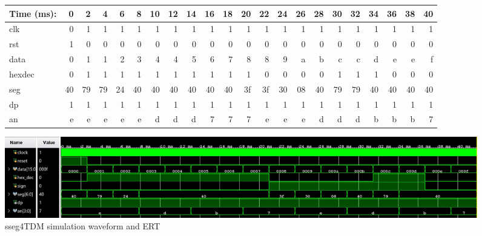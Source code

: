 \documentclass[11pt]{article}
\begin{document}
\begin{figure}[ht]\centering
	\begin{tabular}{l|rrrrrrrrrrrrrrrrrrrrr}
		Time (ms): & 0 & 2 & 4 & 6 & 8  & 10 & 12 & 14 & 16 & 18 & 20 & 22 & 24 & 26 & 28  & 30 & 32 & 34 & 36 & 38 & 40  \\
		\midrule
		clk & 0 & 1 & 1 & 1 & 1 & 1 & 1 & 1 & 1 & 1 & 1 & 1 & 1 & 1 & 1 & 1 & 1 & 1 & 1 & 1 & 1 \\
		rst & 1 & 0 & 0 & 0 & 0 & 0 & 0 & 0 & 0 & 0 & 0 & 0 & 0 & 0 & 0 & 0 & 0 & 0 & 0 & 0 & 0 \\
		data & 0 & 1 & 1 & 2 & 3 & 4 & 4 & 5 & 6 & 7 & 8 & 8 & 9 & a & b & c & c & d & e & e & f\\
		hexdec & 0 & 1 & 1 & 1 & 1 & 1 & 1 & 1 & 1 & 1 & 1 & 0 & 0 & 0 & 0 & 1 & 1 & 1 & 0 & 0 & 0 \\
		\midrule
		seg & 40 & 79 & 79 & 24 & 40 & 40 & 40 & 40 & 40 & 40 & 3f & 3f & 30 & 08 & 40 & 79 & 79 & 40 & 40 & 40 & 40\\
		dp & 1 & 1 & 1 & 1 & 1 & 1 & 1 & 1 & 1 & 1 & 1 & 1 & 1 & 1 & 1 & 1 & 1 & 1 & 1 & 1 & 1\\
		an & e & e & e & e & e & d & d & d & 7 & 7 & 7 & e & e & e & d & d & d & b & b & b & 7\\
		\bottomrule
	\end{tabular}\medskip
	
	\includegraphics[width=1.15 \textwidth]{sseg4_TDM_Test.JPG}
	\caption{sseg4TDM simulation waveform and ERT}
	\label{fig:sim_with_table}
\end{figure}
\end{document}
